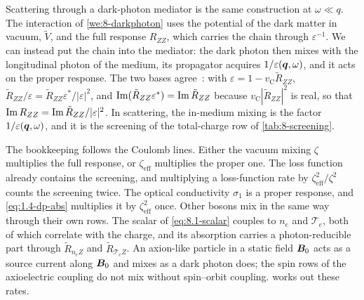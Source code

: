 Scattering through a dark-photon mediator is the same construction at $\omega \ll q$. The interaction of \cref{we:8-darkphoton} uses the potential of the dark matter in vacuum, $\tilde V$, and the full response $R_{ZZ}$, which carries the chain through $\varepsilon^{-1}$. We can instead put the chain into the mediator: the dark photon then mixes with the longitudinal photon of the medium, its propagator acquires $1/\varepsilon(\bm{q},\omega)$, and it acts on the proper response. The two bases agree~\cite[Eq.~(8) and the text below it]{knapen2021dark}: with $\varepsilon = 1 - v_{\mathrm{C}}\tilde R_{ZZ}$, $\tilde R_{ZZ}/\varepsilon = \tilde R_{ZZ}\varepsilon^*/|\varepsilon|^2$, and $\operatorname{Im}(\tilde R_{ZZ}\varepsilon^*) = \operatorname{Im}\tilde R_{ZZ}$ because $v_{\mathrm{C}}|\tilde R_{ZZ}|^2$ is real, so that $\operatorname{Im} R_{ZZ} = \operatorname{Im}\tilde R_{ZZ}/|\varepsilon|^2$. In scattering, the in-medium mixing is the factor $1/\varepsilon(\bm{q},\omega)$, and it is the screening of the total-charge row of \cref{tab:8-screening}.

The bookkeeping follows the Coulomb lines. Either the vacuum mixing $\zeta$ multiplies the full response, or $\zeta_{\mathrm{eff}}$ multiplies the proper one. The loss function already contains the screening, and multiplying a loss-function rate by $\zeta_{\mathrm{eff}}^2/\zeta^2$ counts the screening twice. The optical conductivity $\sigma_1$ is a proper response, and \cref{eq:1.4-dp-abs} multiplies it by $\zeta_{\mathrm{eff}}^2$ once. Other bosons mix in the same way through their own rows. The scalar of \cref{eq:8.1-scalar} couples to $n_e$ and $\mathcal{T}_e$, both of which correlate with the charge, and its absorption carries a photon-reducible part through $\tilde R_{n_eZ}$ and $\tilde R_{\mathcal{T}_eZ}$. An axion-like particle in a static field $\bm{B}_0$ acts as a source current along $\bm{B}_0$ and mixes as a dark photon does; the spin rows of the axioelectric coupling do not mix without spin--orbit coupling.  works out these rates.
